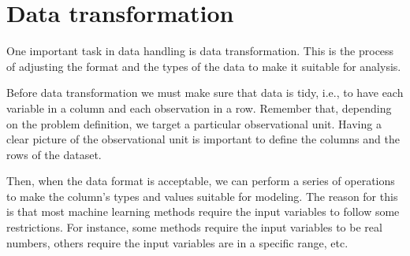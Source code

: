 
\section{Data transformation}

One important task in data handling is data transformation.  This is the process of adjusting
the format and the types of the data to make it suitable for analysis.

Before data transformation we must make sure that data is tidy, i.e., to have
each variable in a column and each observation in a row.  Remember that, depending on the
problem definition, we target a particular observational unit.  Having a clear picture of
the observational unit is important to define the columns and the rows of the dataset.

Then, when the data format is acceptable, we can perform a series of operations to make the
column's types and values suitable for modeling.  The reason for this is that most
machine learning methods require the input variables to follow some restrictions.  For
instance, some methods require the input variables to be real numbers, others require the
input variables are in a specific range, etc.

